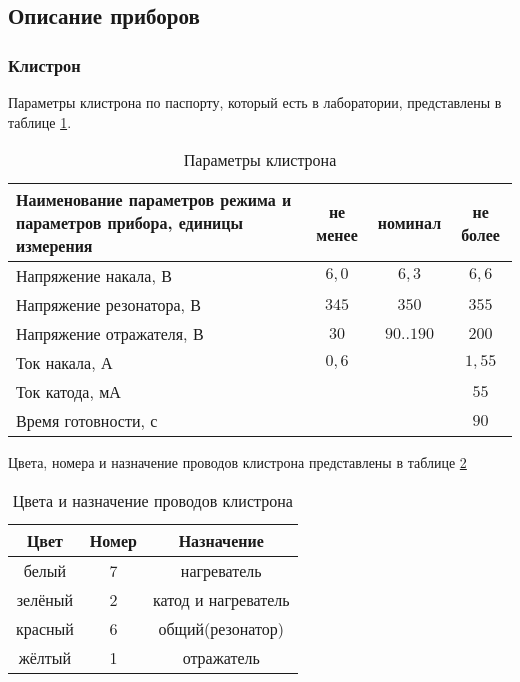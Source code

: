 \documentclass[a4paper]{article}
\begin{document}
	\subsection{Описание приборов}
	\subsubsection{Клистрон}
	
	Параметры клистрона по паспорту, который есть в лаборатории, представлены в таблице \ref{tab1}.
	
	\begin{table}[h]
		\center
        \caption{Параметры клистрона}
        \label{tab1}
		\begin{tabular}{|p{7cm}|c|c|c|}
			\hline
			\centering Наименование параметров режима и параметров прибора, единицы измерения
			& не менее
			& номинал
			& не более \\ \hline
			\centering Напряжение накала, В
			& $6{,}0$
			& $6{,}3$
			& $6{,}6$ \\ \hline
			\centering Напряжение резонатора, В
			& $345$
			& $350$
			& $355$ \\ \hline
			\centering Напряжение отражателя, В
			& $30$
			& $90..190$
			& $200$ \\ \hline
			\centering Ток накала, А
			& $0{,}6$
			& 
			& $1{,}55$ \\ \hline
			\centering Ток катода, мА
			& 
			&
			& $55$ \\ \hline
			\centering Время готовности, с
			&
			&
			& $90$ \\ \hline
		\end{tabular}
	\end{table}
	
	Цвета, номера и назначение проводов клистрона представлены в таблице \ref{tab2}
	\begin{table}[h]
		\center
        \caption{Цвета и назначение проводов клистрона}
        \label{tab2}
		\begin{tabular}{|c|c|c|}
			\hline
			Цвет 	& Номер	& Назначение \\ \hline
			белый 	& 	7	& нагреватель\\ \hline
			зелёный & 	2	& катод и нагреватель\\ \hline
			красный & 	6	& общий(резонатор)\\ \hline
			жёлтый  & 	1	& отражатель\\ \hline
		\end{tabular}
	\end{table}
	
\end{document}
